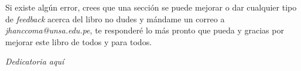 \documentclass[
	12pt, %
	fleqn, %
	a4paper, %
	oneside, %
]{LegrandOrangeBook}
\begin{document}
\noindent Si existe algún error, crees que una sección se puede mejorar o dar cualquier tipo de \textit{feedback} acerca del libro no dudes y mándame un correo a \textit{jhanccoma@unsa.edu.pe}, te responderé lo más pronto que pueda y gracias por mejorar este libro de todos y para todos.
\clearpage
\begin{center}
    \thispagestyle{empty}
    \vspace*{\fill}
    \textit{Dedicatoria aquí}
    \vspace*{\fill}
\end{center}
\clearpage



\pagestyle{empty} %

\tableofcontents %

\cleardoublepage %

\pagestyle{fancy} %
\end{document}
